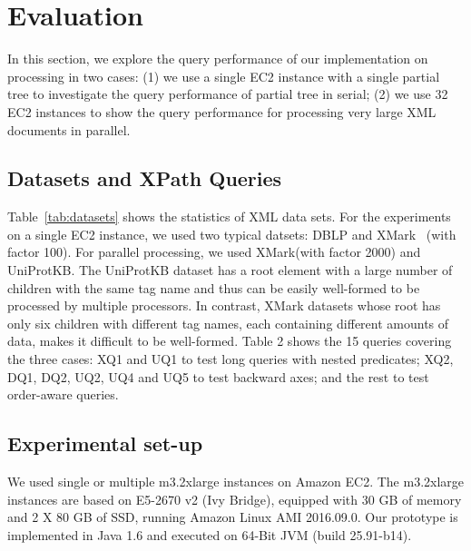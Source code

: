 \section{Evaluation}
\label{sec:evaluation}

In this section, we explore the query performance of our implementation on
processing in two cases: (1) we use a single EC2 instance with a single partial
tree to investigate the query performance of partial tree in serial; (2) we use
32 EC2 instances to show the query performance for processing very large XML
documents in parallel.

\subsection{Datasets and XPath Queries}

Table~\ref{tab:datasets} shows the statistics of XML data sets.  For the
experiments on a single EC2 instance,  we used two typical datsets: DBLP and
XMark~\cite{XMark} (with factor 100). For
parallel processing, we used XMark(with factor 2000) and UniProtKB.  The
UniProtKB dataset has a root element with a large number of children  with the
same tag name and thus can be easily well-formed  to be processed by multiple
processors.  In contrast, XMark datasets whose root has only six children  with
different tag names, each containing different amounts of data,  makes it
difficult to be well-formed. Table 2 shows the 15 queries covering the three
cases: XQ1 and UQ1 to test long queries with nested predicates;  XQ2, DQ1, DQ2,
UQ2, UQ4 and UQ5 to test backward axes;  and the rest to test order-aware
queries.

\subsection{Experimental set-up}

We used single or multiple m3.2xlarge instances on Amazon EC2.  The m3.2xlarge
instances are based on E5-2670 v2 (Ivy Bridge), equipped with 30 GB of memory
and 2 X 80 GB of SSD, running Amazon Linux AMI 2016.09.0. Our prototype is
implemented in Java 1.6 and executed on 64-Bit JVM (build 25.91-b14).

